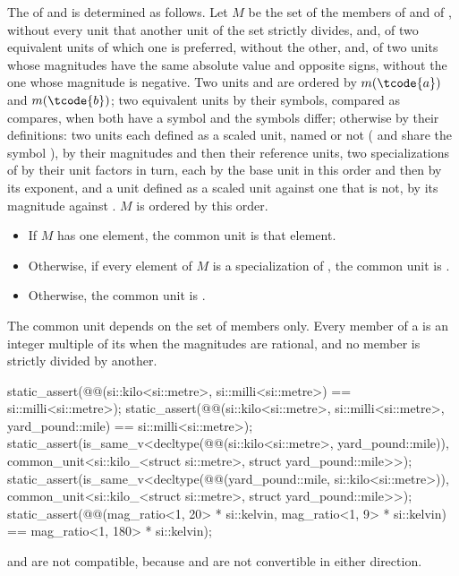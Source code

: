 \begin{itemdescr}
\pnum
The  of  and  is determined as follows.
Let $M$ be the set of the members of  and of ,
without every unit that another unit of the set strictly divides, and,
of two equivalent units of which one is preferred, without the other, and,
of two units whose magnitudes have the same absolute value and opposite signs,
without the one whose magnitude is negative.
Two units  and  are ordered by $m(\tcode{a})$ and $m(\tcode{b})$;
two equivalent units by their symbols, compared as  compares,
when both have a symbol and the symbols differ;
otherwise by their definitions:
two units each defined as a scaled unit, named or not
( and  share the symbol ),
by their magnitudes and then their reference units,
two specializations of  by their unit factors in turn,
each by the base unit in this order and then by its exponent,
and a unit defined as a scaled unit against one that is not, by its magnitude against .
$M$ is ordered by this order.
\begin{itemize}
\item
If $M$ has one element, the common unit is that element.
\item
Otherwise, if every element of $M$ is a specialization of ,
the common unit is .
\item
Otherwise, the common unit is .
\end{itemize}
\begin{note}
The common unit depends on the set of members only.
Every member of a  is an integer multiple of its 
when the magnitudes are rational,
and no member is strictly divided by another.
\end{note}
\begin{example}
\begin{codeblock}
static_assert(@@(si::kilo<si::metre>, si::milli<si::metre>) == si::milli<si::metre>);
static_assert(@@(si::kilo<si::metre>, si::milli<si::metre>, yard_pound::mile) ==
              si::milli<si::metre>);
static_assert(is_same_v<decltype(@@(si::kilo<si::metre>, yard_pound::mile)),
                        common_unit<si::kilo_<struct si::metre>, struct yard_pound::mile>>);
static_assert(is_same_v<decltype(@@(yard_pound::mile, si::kilo<si::metre>)),
                        common_unit<si::kilo_<struct si::metre>, struct yard_pound::mile>>);
static_assert(@@(mag_ratio<1, 20> * si::kelvin, mag_ratio<1, 9> * si::kelvin) ==
              mag_ratio<1, 180> * si::kelvin);
\end{codeblock}
 and  are not compatible,
because  and  are not convertible in either direction.
\end{example}


\end{itemdescr}
